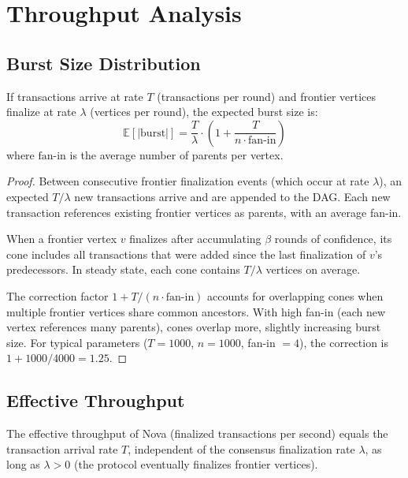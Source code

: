 \section{Throughput Analysis}

\label{sec:throughput}

\subsection{Burst Size Distribution}

\begin{theorem}
\label{thm:burst-size}
If transactions arrive at rate $T$ (transactions per round) and frontier vertices
finalize at rate $\lambda$ (vertices per round), the expected burst size is:
\[
\mathbb{E}[|\text{burst}|] = \frac{T}{\lambda} \cdot \left(1 + \frac{T}{n \cdot \text{fan-in}}\right)
\]
where $\text{fan-in}$ is the average number of parents per vertex.
\end{theorem}

\begin{proof}
Between consecutive frontier finalization events (which occur at rate $\lambda$), an
expected $T/\lambda$ new transactions arrive and are appended to the DAG. Each new
transaction references existing frontier vertices as parents, with an average fan-in.

When a frontier vertex $v$ finalizes after accumulating $\beta$ rounds of confidence,
its cone includes all transactions that were added since the last finalization of $v$'s
predecessors. In steady state, each cone contains $T/\lambda$ vertices on average.

The correction factor $1 + T/(n \cdot \text{fan-in})$ accounts for overlapping cones
when multiple frontier vertices share common ancestors. With high fan-in (each new
vertex references many parents), cones overlap more, slightly increasing burst size.
For typical parameters ($T = 1000$, $n = 1000$, fan-in $= 4$), the correction is
$1 + 1000/4000 = 1.25$.
\end{proof}

\subsection{Effective Throughput}

\begin{corollary}
\label{cor:throughput}
The effective throughput of Nova (finalized transactions per second) equals the
transaction arrival rate $T$, independent of the consensus finalization rate $\lambda$,
as long as $\lambda > 0$ (the protocol eventually finalizes frontier vertices).
\end{corollary}


